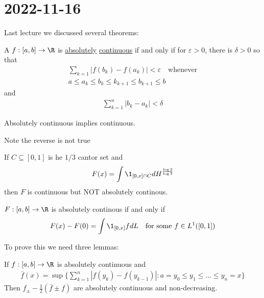 \section{2022-11-16}

Last lecture we discussed several theorems:

\begin{theorem}
A $f : [a,b] \to \R$  is \underline{absolutely} \underline{continuous} if and only if for $\varepsilon > 0$, there is $\delta > 0$ so that
	\begin{align*}
		\sum_{k=1} | f (b_k) - f(a_k) | < \varepsilon \quad \text{whenever} \\
		a \leq a_k \leq b_k \leq k_{k+1} \leq b_{k+1} \leq b
	\end{align*} and
	\begin{align*}
		\sum_{k=1}^{n} | b_k - a_k | < \delta
	\end{align*}
\end{theorem}

\begin{lemma}
	Absolutely continuous implies continuous.
\end{lemma}

Note the reverse is not true

\begin{example}
	If $C \subseteq [0,1]$ is he $1/3$ cantor set and
	\begin{align*}
		F(x) = \int \1_{[0,x] \cap C} dH^{\frac{\log{2}}{\log{3}}}
	\end{align*} then $F$ is continuous but NOT absolutely continous.
\end{example}


\begin{theorem}
	$F : [a,b] \to \R$ is absolutely continous if and only if
	\begin{align*}
		F(x) - F(0) = \int \1_{[0,x]} f dL \quad \text{for some } f \in L^{1} ([0,1])
	\end{align*}
\end{theorem}

To prove this we need three lemmas:

\begin{lemma}
	If $f : [a,b] \to \R$ is absolutely continuous and
	\begin{align*}
		\bar{f} (x) = \sup\{ \sum_{k=1}^{n} | f (y_k) - f (y_{k-1}) | : a = y_0 \leq y_1 \leq \ldots \leq y_n = x \}
	\end{align*}
	Then $f_{\pm} - \frac{1}{2} (\bar{f} \pm f)$ are absolutely continuous and non-decreasing.
\end{lemma}

